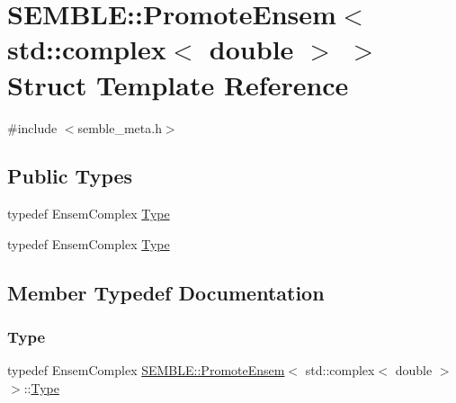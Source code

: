 \hypertarget{structSEMBLE_1_1PromoteEnsem_3_01std_1_1complex_3_01double_01_4_01_4}{}\section{S\+E\+M\+B\+LE\+:\+:Promote\+Ensem$<$ std\+:\+:complex$<$ double $>$ $>$ Struct Template Reference}
\label{structSEMBLE_1_1PromoteEnsem_3_01std_1_1complex_3_01double_01_4_01_4}


{\ttfamily \#include $<$semble\+\_\+meta.\+h$>$}

\subsection*{Public Types}
\begin{DoxyCompactItemize}
\item 
typedef Ensem\+Complex \mbox{\hyperlink{structSEMBLE_1_1PromoteEnsem_3_01std_1_1complex_3_01double_01_4_01_4_a86cb6b2c8e60fc197b97aceb98bfe2be}{Type}}
\item 
typedef Ensem\+Complex \mbox{\hyperlink{structSEMBLE_1_1PromoteEnsem_3_01std_1_1complex_3_01double_01_4_01_4_a86cb6b2c8e60fc197b97aceb98bfe2be}{Type}}
\end{DoxyCompactItemize}


\subsection{Member Typedef Documentation}
\mbox{\label{structSEMBLE_1_1PromoteEnsem_3_01std_1_1complex_3_01double_01_4_01_4_a86cb6b2c8e60fc197b97aceb98bfe2be}} 
\subsubsection{\texorpdfstring{Type}{Type}\hspace{0.1cm}{\footnotesize\ttfamily [1/2]}}
{\footnotesize\ttfamily typedef Ensem\+Complex \mbox{\hyperlink{structSEMBLE_1_1PromoteEnsem}{S\+E\+M\+B\+L\+E\+::\+Promote\+Ensem}}$<$ std\+::complex$<$ double $>$ $>$\+::\mbox{\hyperlink{structSEMBLE_1_1PromoteEnsem_3_01std_1_1complex_3_01double_01_4_01_4_a86cb6b2c8e60fc197b97aceb98bfe2be}{Type}}}

